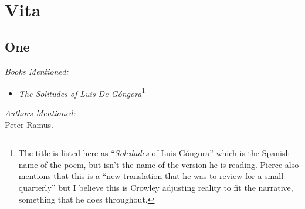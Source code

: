 \documentclass[12pt,makeidx]{extreport}
\newcommand\nbvspace[1][3]{\vspace*{\stretch{#1}}}
\begin{document}
\begin{center}
\vfill
\shadowoffset{1pt}
\shadowtext{%
{\color{Mahogany}\fontsize{64}{64}\Saturn}}\\
\nbvspace[1]
\end{center}



\chapter{Vita}
\section{One}
\textit{Books Mentioned:}
\begin{itemize}
\item \textit{The Solitudes of Luis De Góngora}\footnote{The title is listed here as ``\textit{Soledades} of Luis Góngora'' which is the Spanish name of the poem, but isn't the name of the version he is reading. Pierce also mentions that this is a ``new translation that he was to review for a small quarterly'' but I believe this is Crowley adjusting reality to fit the narrative, something that he does throughout.} \cite{DeGongoraYArgote1968}
\end{itemize}
\textit{Authors Mentioned:}\\
Peter Ramus.\\
\end{document}
